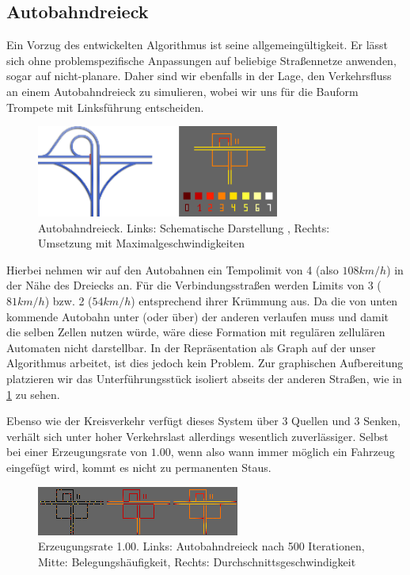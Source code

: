 \documentclass[11pt, a4paper]{article}
\newcommand\q[1]{\glqq{}#1\grqq{}}
\begin{document}
\subsection{Autobahndreieck}
Ein Vorzug des entwickelten Algorithmus ist seine allgemeingültigkeit. Er lässt sich ohne problemspezifische Anpassungen auf beliebige Straßennetze anwenden, sogar auf nicht-planare. Daher sind wir ebenfalls in der Lage, den Verkehrsfluss an einem Autobahndreieck zu simulieren, wobei wir uns für die Bauform \q{Trompete} mit Linksführung entscheiden.

\begin{figure}[h!]
	\centering
	\includegraphics[width=8cm]{img/interchangeTrumpetSpeedLimits}
	\caption{Autobahndreieck. Links: Schematische Darstellung \cite{wiki:trumpetInterchange}, Rechts: Umsetzung mit Maximalgeschwindigkeiten}
	\label{fig:interchangeTrumpet}
\end{figure}

Hierbei nehmen wir auf den Autobahnen ein Tempolimit von 4 (also $108km/h$) in der Nähe des Dreiecks an. Für die Verbindungsstraßen werden Limits von 3 ($81km/h$) bzw. 2 ($54km/h$) entsprechend ihrer Krümmung aus. Da die von unten kommende Autobahn unter (oder über) der anderen verlaufen muss und damit die selben Zellen nutzen würde, wäre diese Formation mit regulären zellulären Automaten nicht darstellbar. In der Repräsentation als Graph auf der unser Algorithmus arbeitet, ist dies jedoch kein Problem. Zur graphischen Aufbereitung platzieren wir das Unterführungsstück isoliert abseits der anderen Straßen, wie in \ref{fig:interchangeTrumpet} zu sehen.

Ebenso wie der Kreisverkehr verfügt dieses System über 3 Quellen und 3 Senken, verhält sich unter hoher Verkehrslast allerdings wesentlich zuverlässiger. Selbst bei einer Erzeugungsrate von $1.00$, wenn also wann immer möglich ein Fahrzeug eingefügt wird, kommt es nicht zu permanenten Staus.

\begin{figure}[h!]
	\centering
	\includegraphics[width=\textwidth]{img/interchangeTrumpet_100}
	\caption{Erzeugungsrate 1.00. Links: Autobahndreieck nach 500 Iterationen, Mitte: Belegungshäufigkeit, Rechts: Durchschnittsgeschwindigkeit}
	\label{fig:interchangeTrumpet100}
\end{figure}
\end{document}
